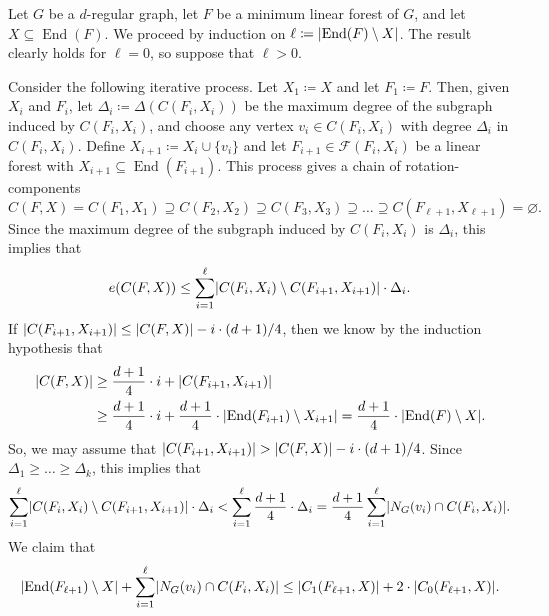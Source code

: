 \documentclass[11pt]{article}
\makeatletter
\theoremstyle{plain}
\theoremstyle{definition}
\renewenvironment{proof}[1][\proofname]
{\par\pushQED{\qed}
	\normalfont\topsep6\p@\@plus6\p@\relax\trivlist
	\item[\hskip\labelsep\bfseries#1\@addpunct{.}]
	\ignorespaces}
{\popQED\endtrivlist\@endpefalse}
\let\emptyset\varnothing
\newcommand{\cF}{\mathcal F}
\DeclarePairedDelimiter{\abs}{\lvert}{\rvert}
\DeclareMathOperator{\End}{End}
\makeatother
\begin{document}
\begin{proof}[Proof of \cref{prop:componentsize}]
    Let $G$ be a $d$-regular graph, let $F$ be a minimum linear forest of $G$, and let $X \subseteq \End(F)$. We proceed by induction on $\ell \coloneqq \abs{\End(F) \setminus X}$. The result clearly holds for $\ell = 0$, so suppose that $\ell > 0$.
    
    Consider the following iterative process. Let $X_1 \coloneqq X$ and let $F_1 \coloneqq F$. Then, given $X_i$ and $F_i$, let $\Delta_i \coloneqq \Delta(C(F_i,X_i))$ be the maximum degree of the subgraph induced by $C(F_i,X_i)$, and choose any vertex $v_i \in C(F_i,X_i)$ with degree $\Delta_i$ in $C(F_i,X_i)$. Define $X_{i+1} \coloneqq X_i \cup \{v_i\}$ and let $F_{i+1} \in \cF(F_i,X_i)$ be a linear forest with $X_{i+1} \subseteq \End(F_{i+1})$. This process gives a chain of rotation-components
    \[
        C(F,X) = C(F_1,X_1) \supseteq C(F_2,X_2) \supseteq C(F_3,X_3) \supseteq \dots \supseteq C(F_{\ell+1},X_{\ell+1}) = \emptyset.
    \]
    Since the maximum degree of the subgraph induced by $C(F_i,X_i)$ is $\Delta_i$, this implies that
    \begin{equation}
        e(C(F,X)) \le \sum_{i = 1}^\ell \abs{C(F_i,X_i) \setminus C(F_{i+1},X_{i+1})} \cdot \Delta_i. \label{eq:edgessumdelta}
    \end{equation}
    If $\abs{C(F_{i+1},X_{i+1})} \le \abs{C(F,X)} - i \cdot (d+1)/4$, then we know by the induction hypothesis that
    \begin{align*}
        \abs{C(F,X)} & \ge \frac{d+1}{4} \cdot i + \abs{C(F_{i+1},X_{i+1})} \\
        & \ge \frac{d+1}{4} \cdot i + \frac{d+1}{4} \cdot \abs{\End(F_{i+1}) \setminus X_{i+1}} = \frac{d+1}{4} \cdot \abs{\End(F) \setminus X}.
    \end{align*}
    So, we may assume that $\abs{C(F_{i+1},X_{i+1})} > \abs{C(F,X)} - i \cdot (d+1)/4$. Since $\Delta_1 \ge \dots \ge \Delta_k$, this implies that
    \begin{equation}
        \sum_{i = 1}^\ell \abs{C(F_i,X_i) \setminus C(F_{i+1},X_{i+1})} \cdot \Delta_i < \sum_{i = 1}^\ell \frac{d+1}{4} \cdot \Delta_i = \frac{d+1}{4} \sum_{i=1}^\ell \abs{N_G(v_i) \cap C(F_i,X_i)}. \label{eq:sumdeltasizeneighbours}
    \end{equation}
    We claim that
    \begin{equation}
        \abs{\End(F_{\ell+1}) \setminus X} + \sum_{i=1}^\ell \abs{N_G(v_i) \cap C(F_i,X_i)} \le \abs{C_1(F_{\ell+1},X)} + 2 \cdot \abs{C_0(F_{\ell+1},X)}. \label{eq:sizeneighbourssizecomponent}

\end{equation}
\end{proof}
\end{document}
